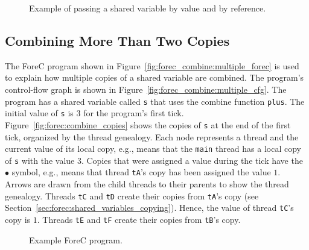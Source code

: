 \begin{figure}
	\centering

	\begin{minipage}[b]{0.8\textwidth}
		
	\end{minipage}

	\caption{Example of passing a shared variable by value and by reference.}
	\label{fig:forec_combine:passing}
\end{figure}

\newpage


\subsection{Combining More Than Two Copies}
\label{sec:forec_combine:copies}
The ForeC program shown in
Figure~\ref{fig:forec_combine:multiple_forec} is used to
explain how multiple copies of a shared variable are
combined. The program's control-flow graph is shown in
Figure~\ref{fig:forec_combine:multiple_cfg}. The program has
a shared variable called \verb$s$ that uses the combine
function \verb$plus$. The initial value of \verb$s$ is $3$ 
for the program's first tick.
Figure~\ref{fig:forec:combine_copies} shows the copies of
\verb$s$ at the end of the first tick, organized by the
thread genealogy. Each node represents a thread and the 
current value of its local
copy, e.g., {\setlength{\fboxsep}{3pt}} means
that the \verb$main$ thread has a local copy 
of \texttt{s} with the value $3$.
Copies that were assigned a value during the tick have the
$\bullet$ symbol, e.g., 
{\setlength{\fboxsep}{3pt}} means that 
thread \verb$tA$'s copy has been assigned the value $1$. 
Arrows are drawn from the 
child threads to their parents to show the thread genealogy.
Threads \texttt{tC} and \texttt{tD} create their copies
from \verb$tA$'s copy (see Section~\ref{sec:forec:shared_variables_copying}). 
Hence, the value of thread \verb$tC$'s 
copy is $1$. Threads \texttt{tE} and \texttt{tF} create
their copies from \texttt{tB}'s copy.

\begin{figure}
	\centering

	\hfill
	\caption{Example ForeC program.}
\end{figure}

